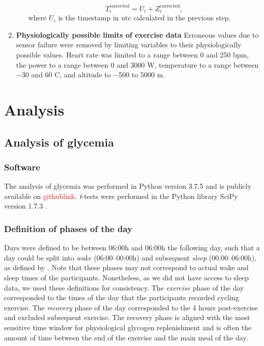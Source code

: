 \documentclass[11pt,a4paper]{article}
\newcommand\TODO[1]{\textcolor{red}{#1}}
\begin{document}
\begin{enumerate}[label=\textbf{\arabic*}.]
\begin{enumerate}
    \begin{equation}\label{eq:utc2local}
        T^{\text{corrected}}_i = U_i + Z^{\text{corrected}}_i,
    \end{equation}
    where $U_i$ is the timestamp in \gls{utc} calculated in the previous step.
\end{enumerate}

\item \textbf{Physiologically possible limits of exercise data}
Erroneous values due to sensor failure were removed by limiting variables to their physiologically possible values. Heart rate was limited to a range between 0 and 250 bpm, the power to a range between 0 and 3000 W, temperature to a range between $-$30 and 60 \textdegree C, and altitude to $-$500 to 5000 m.
\end{enumerate}

\newpage
\section{Analysis}
\subsection{Analysis of glycemia}
\subsubsection{Software} The analysis of glycemia was performed in Python \cite{python} version 3.7.5 and is publicly available on \TODO{githublink}. \textit{t}-tests were performed in the Python library SciPy version 1.7.3 \cite{scipy}.

\subsubsection{Definition of phases of the day}
Days were defined to be between 06:00h and 06:00h the following day, such that a day could be split into \textit{wake} (06:00--00:00h) and subsequent \textit{sleep} (00:00--06:00h), as defined by \citet{29162583}. Note that these phases may not correspond to actual wake and sleep times of the participants. Nonetheless, as we did not have access to sleep data, we used these definitions for consistency. The \textit{exercise} phase of the day corresponded to the times of the day that the participants recorded cycling exercise. The \textit{recovery} phase of the day corresponded to the 4 hours post-exercise and excluded subsequent exercise. The recovery phase is aligned with the most sensitive time window for physiological glycogen replenishment and is often the amount of time between the end of the exercise and the main meal of the day.
\end{document}
